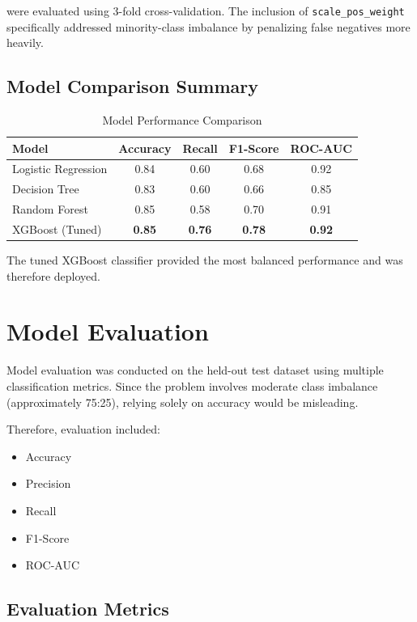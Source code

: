 \documentclass[12pt, a4paper]{article}
\begin{document}
were evaluated using 3-fold cross-validation. The inclusion of \texttt{scale\_pos\_weight} specifically addressed minority-class imbalance by penalizing false negatives more heavily.

\subsection{Model Comparison Summary}

\begin{table}[H]
\centering
\caption{Model Performance Comparison}
\begin{tabular}{lcccc}
\toprule
Model & Accuracy & Recall & F1-Score & ROC-AUC \\
\midrule
Logistic Regression & 0.84 & 0.60 & 0.68 & 0.92 \\
Decision Tree & 0.83 & 0.60 & 0.66 & 0.85 \\
Random Forest & 0.85 & 0.58 & 0.70 & 0.91 \\
\rowcolor{solarblue!8}
XGBoost (Tuned) & \textbf{0.85} & \textbf{0.76} & \textbf{0.78} & \textbf{0.92} \\
\bottomrule
\end{tabular}
\end{table}

The tuned XGBoost classifier provided the most balanced performance and was therefore deployed.
\newpage
\section{Model Evaluation}

Model evaluation was conducted on the held-out test dataset using multiple classification metrics. Since the problem involves moderate class imbalance (approximately 75:25), relying solely on accuracy would be misleading.

Therefore, evaluation included:

\begin{itemize}
\item Accuracy
\item Precision
\item Recall
\item F1-Score
\item ROC-AUC
\end{itemize}

\subsection{Evaluation Metrics}
\end{document}

